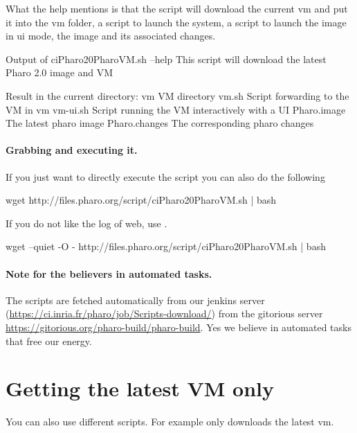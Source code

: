 \documentclass[a4paper,10pt,twoside]{book}
\begin{document}
What the help mentions is that the script will download the current vm and put it into the vm folder,  a script to launch the system, 
 a script to launch the image in ui mode, the image and its associated changes. 

\begin{code}{Output of ciPharo20PharoVM.sh --help }
This script will download the latest Pharo 2.0 image and VM

Result in the current directory:
    vm            VM directory
    vm.sh            Script forwarding to the VM in vm
    vm-ui.sh            Script running the VM interactively with a UI
    Pharo.image            The latest pharo image
    Pharo.changes            The corresponding pharo changes
\end{code}



\paragraph{Grabbing and executing it.}
If you just want to directly execute the script you can also do the following

\begin{code}{}
wget http://files.pharo.org/script/ciPharo20PharoVM.sh | bash
\end{code}

If you do not like the log of web, use .

\begin{code}{}
wget --quiet -O - http://files.pharo.org/script/ciPharo20PharoVM.sh | bash
\end{code}

\paragraph{Note for the believers in automated tasks.} The scripts are fetched automatically from 
our jenkins server (\url{https://ci.inria.fr/pharo/job/Scripts-download/}) from the gitorious server \url{https://gitorious.org/pharo-build/pharo-build}.
Yes we believe in automated tasks that free our energy. 



\section{Getting the latest VM only}
You can also use different scripts. For example  only downloads the latest vm.
\end{document}
